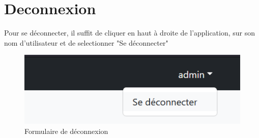 \section{Deconnexion}

Pour se déconnecter, il suffit de cliquer en haut à droite de l'application, sur son nom d'utilisateur et de selectionner "Se déconnecter"

\begin{figure}[H]
	\centering
	\includegraphics[keepaspectratio,width=12cm]{images/Emploi12}
	\caption{Formulaire de déconnexion}
\end{figure}